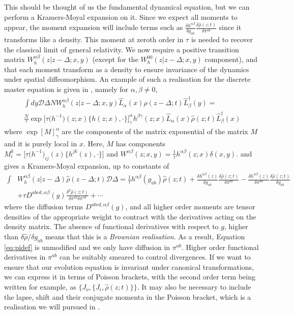 \documentclass[aps,pra,showpacs,citeautoscript,amsmath,amssymb,floatfix,superscriptaddress,bbm, verbatim,amsfonts,changes,11pt,nofootinbib,longbibliography]{revtex4-2}
\def\z{{z}}
\def\L{{\hat{L}}}
\def\dist{{\Delta}}
\def\ddf{{\mathcal D}\dist}
\def\g{{g}}
\def\rate{{W}}
\def\ab{^{\alpha\beta}}
\def\lax{{\L_\alpha(x)}}
\def\lbx{{\L^\dagger_\beta(x)}}
\def\lby{{\L^\dagger_\beta(y)}}
\renewcommand{\varrho}{\hat{\rho}}
\def\psiz{{\varrho(\z;t)}}
\def\psizd{{\varrho(\z-\dist;t)}}
\def\PB{\}}
\begin{document}
This should be thought of us the fundamental dynamical equation, but
we can perform a Kramers-Moyal expansion on it. Since we expect all moments to appear, the moment expansion will include terms such as
$\frac{\delta h\ab}{\delta g_{ab}}\frac{\delta\psiz}{\delta \pi^{ab}}$ since it transforms like a density. This moment at 
zeroth order in $\tau$ is needed to recover the classical limit of general
relativity. 
We now require a positive transition matrix $\rate_h\ab(\z|\z-\dist;x,y)$  (except for the $\rate_{h}^{00}(\z|\z-\dist;x,y)$ component), and that each moment transform as a density to ensure invariance of the dynamics under spatial diffeomorphism. An example of such a realisation for the discrete master equation is given in  \cite{UCL2022constraints}, namely for $\alpha,\beta\neq 0$, 
\begin{multline}
\int dy \ddf N\rate_h\ab(\z|\z-\dist;x,y)\lax\psizd\lby
=\\
\frac{N}{\tau}
\exp\Big[{\tau{({h^{-1})}(\z;x)}\{h(\z;x),\cdot\PB}\Big]^\alpha_\gamma h^{\beta\gamma}(\z;x)
\lax\psiz\lbx
\label{eq:modelcov}
\end{multline}
where $\exp[M]^\alpha_\gamma$ are the components of the matrix exponential of the matrix $M$ and it is purely local in $x$. Here, $M$ has components $M_i^k=\Big[{\tau{({h^{-1})_{ij}}(\z)}\{h^{jk}(\z),\cdot\PB}\Big]$ and  $\rate\ab(\z;x,y)=\frac{1}{\tau}h\ab(\z;x)\delta(x,y)$. 
and gives a Kramers-Moyal expansion, up to constants of
\begin{align}
\int& \rate_h\ab(\z|\z-\dist)\psizd\ddf
=
\frac{1}{\tau}
h\ab(g_{ab})
\psiz
+
\frac{\delta h\ab(\z)}{\delta g_{ab}}\frac{\delta\psiz}{\delta \pi^{ab}}
-
\frac{\delta h\ab(\z)}{\delta \pi^{ab}}\frac{\delta\psiz}{\delta g_{ab}}
\nonumber\\
&
+
\tau D^{abcd,\alpha\beta}(\g)
\frac{\delta^2\psiz }{\delta \pi^{ab}\delta \pi^{cd}}
+\cdots
\label{eq:GRfirstfewmoment}
\end{align}
where the diffusion terms $D^{abcd,\alpha\beta}(\g)$, and all higher order moments are tensor densities of the appropriate weight to contract with the derivatives acting on the density matrix. 
The absence of functional derivatives with respect to $g$, higher than $\delta \varrho/\delta g_{ab}$ means that this is a {\it Brownian realisation}. As a result,
Equation \eqref{eq:pidef} is unmodified and we only have diffusion in $\pi^{ab}$. Higher order functional derivatives in $\pi^{ab}$ can be suitably smeared to control divergences. If we want to ensure that our evolution equation is invariant under canonical transformations, we can express it in terms of Poisson brackets, with the second order term being written for example, as $\{J_o,\{J_i,\psiz\}\}$. It may also be necessary to include the lapse, shift and their conjugate momenta in the Poisson bracket, which is a realisation we will pursued in  \cite{oppenheim2021constraints}.
\end{document}
